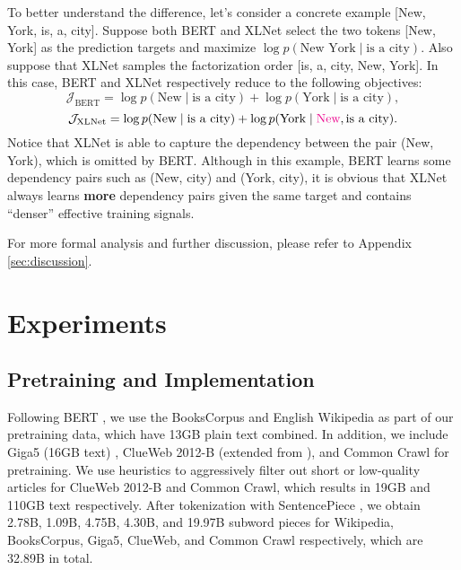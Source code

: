 \documentclass{article}
\newcommand{\magenta}[1]{{\color{magenta}#1}} \usepackage{amsmath,amsfonts,bm}
\begin{document}
To better understand the difference, let's consider a concrete example [New, York, is, a, city]. Suppose both BERT and XLNet select the two tokens [New, York] as the prediction targets and maximize $\log p(\text{New York} \mid \text{is a city})$. Also suppose that XLNet samples the factorization order [is, a, city, New, York]. In this case, BERT and XLNet respectively reduce to the following objectives:
\[
\mathcal{J}_{\text{BERT}} = \log p(\text{New} \mid \text{is a city}) + \log p(\text{York} \mid \text{is a city}),
\]
\[
\mathcal{J}_{\text{XLNet}} = \log p(\text{New} \mid \text{is a city}) + \log p(\text{York} \mid \magenta{\text{New}}, \text{is a city}).
\]
Notice that XLNet is able to capture the dependency between the pair (New, York), which is omitted by BERT. 
Although in this example, BERT learns some dependency pairs such as (New, city) and (York, city), it is obvious that XLNet always learns \textbf{more} dependency pairs given the same target and contains ``denser'' effective training signals.

For more formal analysis and further discussion, please refer to Appendix \ref{sec:discussion}.















 










\section{Experiments} \label{sec:exp}



\subsection{Pretraining and Implementation}
\label{sec:implementation}

Following BERT \cite{devlin2018bert}, we use the BooksCorpus \cite{zhu2015aligning} and English Wikipedia as part of our pretraining data, which have 13GB plain text combined. In addition, we include Giga5 (16GB text) \cite{parker2011english}, ClueWeb 2012-B (extended from \cite{callan2009clueweb09}), and Common Crawl \cite{crawlcommon} for pretraining. We use heuristics to aggressively filter out short or low-quality articles for ClueWeb 2012-B and Common Crawl, which results in 19GB and 110GB text respectively. After tokenization with SentencePiece \cite{kudo2018sentencepiece}, we obtain 2.78B, 1.09B, 4.75B, 4.30B, and 19.97B subword pieces for Wikipedia, BooksCorpus, Giga5, ClueWeb, and Common Crawl respectively, which are 32.89B in total. 
\end{document}
